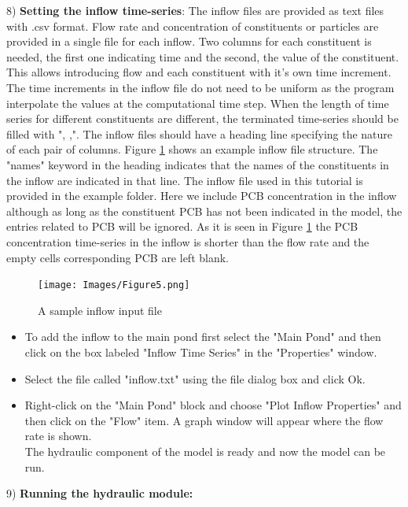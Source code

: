 8) \textbf{Setting the inflow time-series}:
The inflow files are provided as text files with .csv format. Flow rate and concentration of constituents or particles are provided in a single file for each inflow. Two columns for each constituent is needed, the first one indicating time and the second, the value of the constituent. This allows introducing flow and each constituent with it's own time increment. The time increments in the inflow file do not need to be uniform as the program interpolate the values at the computational time step. When the length of time series for different constituents are different, the terminated time-series should be filled with ", ,". The inflow files should have a heading line specifying the nature of each pair of columns. Figure \ref{fig:5} shows an example inflow file structure. The "names" keyword in the heading indicates that the names of the constituents in the inflow are indicated in that line. The inflow file used in this tutorial is provided in the example folder. Here we include PCB concentration in the inflow although as long as the constituent PCB has not been indicated in the model, the entries related to PCB will be ignored. As it is seen in Figure \ref{fig:5} the PCB concentration time-series in the inflow is shorter than the flow rate and the empty cells corresponding PCB are left blank. 
\begin{figure}[!ht]\label{fig:5}
\begin{center}
\texttt{[image: Images/Figure5.png]} \\
\caption{A sample inflow input file} 
\end{center}
\end{figure}
\begin{itemize}
\item To add the inflow to the main pond first select the "Main Pond" and then click on the box labeled "Inflow Time Series" in the "Properties" window.
\item Select the file called "inflow.txt" using the file dialog box and click Ok. 
\item Right-click on the "Main Pond" block and choose "Plot Inflow Properties" and then click on the "Flow" item. A graph window will appear where the flow rate is shown. \\
The hydraulic component of the model is ready and now the model can be run.
\end{itemize}
9) \textbf{Running the hydraulic module: }
